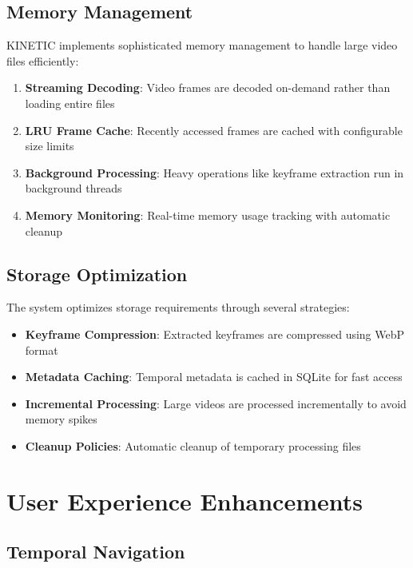 \documentclass[10pt]{article}
\begin{document}
\subsection{Memory Management}

KINETIC implements sophisticated memory management to handle large video files efficiently:

\begin{enumerate}
    \item \textbf{Streaming Decoding}: Video frames are decoded on-demand rather than loading entire files
    \item \textbf{LRU Frame Cache}: Recently accessed frames are cached with configurable size limits
    \item \textbf{Background Processing}: Heavy operations like keyframe extraction run in background threads
    \item \textbf{Memory Monitoring}: Real-time memory usage tracking with automatic cleanup
\end{enumerate}

\subsection{Storage Optimization}

The system optimizes storage requirements through several strategies:

\begin{itemize}
    \item \textbf{Keyframe Compression}: Extracted keyframes are compressed using WebP format
    \item \textbf{Metadata Caching}: Temporal metadata is cached in SQLite for fast access
    \item \textbf{Incremental Processing}: Large videos are processed incrementally to avoid memory spikes
    \item \textbf{Cleanup Policies}: Automatic cleanup of temporary processing files
\end{itemize}

\section{User Experience Enhancements}

\subsection{Temporal Navigation}
\end{document}
